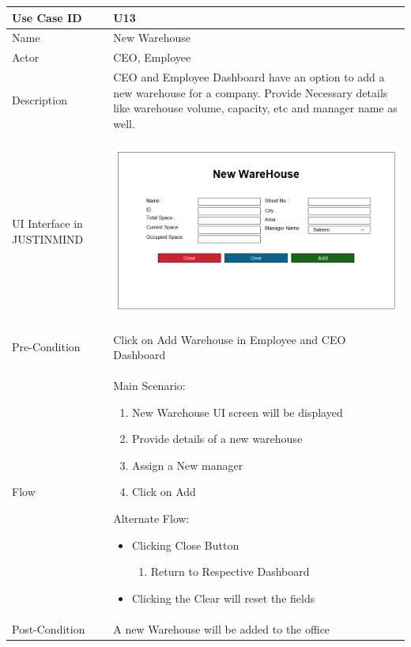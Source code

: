 \documentclass[12pt,a4paper]{report}
\begin{document}
\begin{tabular}{ | m{3cm} | m{12cm}| } \hline

Use Case ID &  U13 \\\hline

Name  	    &  New Warehouse \\ \hline

Actor     	& CEO, Employee \\ \hline

Description &  CEO and Employee Dashboard have an option to add a new warehouse for a company. Provide Necessary details like warehouse volume, capacity, etc and manager name as well. \\ \hline

UI Interface in JUSTINMIND & \begin{center} \includegraphics[scale=0.3]{./UIs for Latex Reports/UI-014 AddWarehouse@1x.png}\end{center}  \\ \hline

Pre-Condition &   Click on Add Warehouse in Employee and CEO Dashboard\\ \hline


Flow & Main Scenario:

\begin{enumerate}
\item   New Warehouse UI screen will be displayed
\item  Provide details of a new warehouse
\item  Assign a New manager
\item  Click on Add


\end{enumerate}

Alternate Flow:

\begin{itemize}
\item 	Clicking Close Button
	\begin{enumerate}
		\item 	Return to Respective Dashboard
	\end{enumerate}
\item Clicking the Clear will reset the fields
\end{itemize}
\\ \hline
Post-Condition &  A new Warehouse will be added to the office   \\ \hline

\end{tabular}
\end{document}
